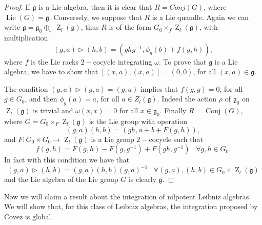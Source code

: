 \documentclass[english,4paper,10pt]{article}
\newcommand{\mg}{\mathfrak{g}}
\begin{document}
\begin{proof} 
	If $\mg$ is a Lie algebra, then it is clear that $R=Conj(G)$, where $\operatorname{Lie}(G)=\mg$.
	Conversely, we suppose that $R$ is a Lie quandle. Again we can write $\mg=\mg_0\oplus_\omega \operatorname{Z}_l(\mg)$, thus $R$ is of the form $G_0\times_f \operatorname{Z}_l(\mg)$, with multiplication 
	$$
	(g,a)\rhd (h,b)=\left(ghg^{-1}, \phi_g(b)+f(g,h)\right),
	$$
	where $f$ is the Lie racks $2-$cocycle integrating $\omega$. To prove that $\mg$ is a Lie algebra, we have to show that $\left[(x,a),(x,a)\right]=(0,0)$, for all $(x,a)\in\mg$.
	
	The condition $(g,a)\rhd(g,a)=(g,a)$ implies that $f(g,g)=0$, for all $g\in G_0$, and then $\phi_g(a)=a$, for all $a\in Z_l(\mg)$. Indeed the action $\rho$ of $\mg_0$ on $\operatorname{Z}_l(\mg)$ is trivial and $\omega(x,x)=0$ for all $x\in\mg_0$. Finally $R=\operatorname{Conj}(G)$, where $G=G_0\times_F \operatorname{Z}_l(\mg)$ is the Lie group with operation 
	$$
	(g,a)(h,b)=(gh, a+b+F(g,h)),
	$$
	and $F\colon G_0\times G_0\rightarrow \operatorname{Z}_l(\mg)$ is a Lie group $2-$cocycle such that 
	$$
	f(g,h)=F(g,h)-F(g,g^{-1})+F(gh,g^{-1})\;\;\;\forall g,h\in G_0.
	$$
	In fact with this condition we have that
	$$
	(g,a)\rhd (h,b)=(g,a)(h,b)(g,a)^{-1} \;\;\;\forall (g,a),(h,b)\in G_0\times \operatorname{Z}_l(\mg)
	$$
	and the Lie algebra of the Lie group $G$ is clearly $\mg$.
\end{proof}

Now we will claim a result about the integration of  nilpotent Leibniz algebras. We will show that, for this class of Leibniz algebras, the integration proposed by Covez is global. 
\end{document}
